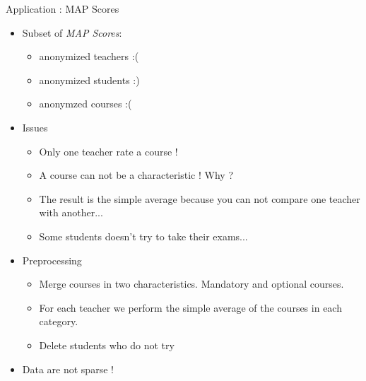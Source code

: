 \begin{frame}{Application : MAP Scores}
\begin{itemize}
    \item Subset of \textit{MAP Scores}:
    \begin{itemize}
        \item {} anonymized teachers :(
        \item {} anonymized students :)
        \item {} anonymzed courses :(
    \end{itemize}
    \item Issues
    \begin{itemize}
        \item Only one teacher rate a course !
        \item A course can not be a characteristic ! Why ?
        \item The result is the simple average because you can not compare one teacher with another...
        \item Some students doesn't try to take their exams...
    \end{itemize}
    \item Preprocessing
        \begin{itemize}
            \item Merge courses in two characteristics. Mandatory and optional courses.
            \item For each teacher we perform the simple average of the courses in each category.
            \item Delete students who do not try
        \end{itemize}
    \item Data are not sparse !
\end{itemize}
\end{frame}

